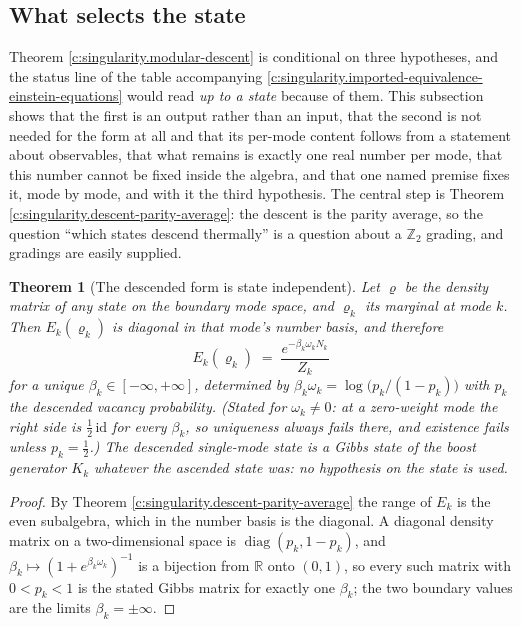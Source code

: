 \documentclass[11pt]{article}
\newtheorem{theorem}{Theorem}[section]
\theoremstyle{definition}
\theoremstyle{plain}
\providecommand{\R}{}\renewcommand{\R}{\mathbb{R}}
\begin{document}
\subsection*{What selects the state}
\label{c:note.singularity.setting-what-selects-state}
Theorem \ref{c:singularity.modular-descent} is conditional on three hypotheses, and the status line of the table accompanying \ref{c:singularity.imported-equivalence-einstein-equations} would read \emph{up to a state} because of them. This subsection shows that the first is an output rather than an input, that the second is not needed for the form at all and that its per-mode content follows from a statement about observables, that what remains is exactly one real number per mode, that this number cannot be fixed inside the algebra, and that one named premise fixes it, mode by mode, and with it the third hypothesis. The central step is Theorem \ref{c:singularity.descent-parity-average}: the descent is the parity average, so the question ``which states descend thermally'' is a question about a $\mathbb{Z}_2$ grading, and gradings are easily supplied.

\begin{theorem}[The descended form is state independent]\label{c:singularity.descended-form-state-independent}
Let $\varrho$ be the density matrix of \emph{any} state on the boundary mode space, and $\varrho_k$ its marginal at mode $k$. Then $E_k(\varrho_k)$ is diagonal in that mode's number basis, and therefore
\[
E_k(\varrho_k) \;=\; \frac{e^{-\beta_k \omega_k N_k}}{Z_k}
\]
for a unique $\beta_k \in [-\infty, +\infty]$, determined by $\beta_k\omega_k = \log\bigl(p_k/(1-p_k)\bigr)$ with $p_k$ the descended vacancy probability. (Stated for $\omega_k \neq 0$: at a zero-weight mode the right side is $\tfrac12\,\mathrm{id}$ for every $\beta_k$, so uniqueness always fails there, and existence fails unless $p_k = \tfrac12$.) The descended single-mode state is a Gibbs state of the boost generator $K_k$ whatever the ascended state was: no hypothesis on the state is used.
\end{theorem}
\begin{proof}
By Theorem \ref{c:singularity.descent-parity-average} the range of $E_k$ is the even subalgebra, which in the number basis is the diagonal. A diagonal density matrix on a two-dimensional space is $\operatorname{diag}(p_k, 1 - p_k)$, and $\beta_k \mapsto (1 + e^{\beta_k\omega_k})^{-1}$ is a bijection from $\R$ onto $(0,1)$, so every such matrix with $0 < p_k < 1$ is the stated Gibbs matrix for exactly one $\beta_k$; the two boundary values are the limits $\beta_k = \pm\infty$.

\end{proof}
\end{document}
